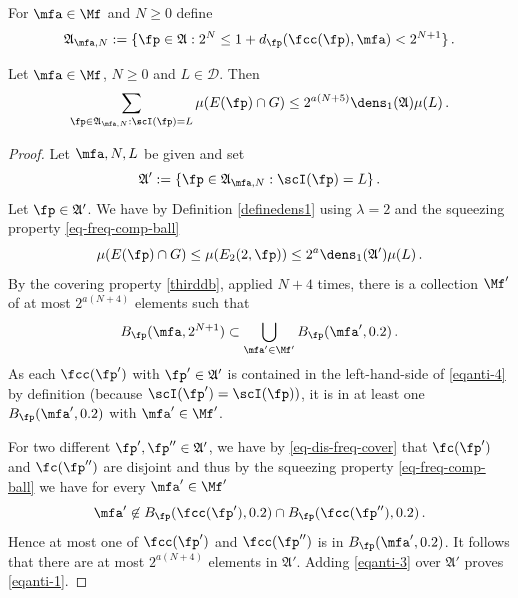 For $\mfa \in \Mf$ and $N\ge 0$ define
\begin{equation}\label{eqantidefap}
    \mathfrak{A}_{\mfa,N}:=\{\fp\in\mathfrak{A}: 2^{N}\le 1+d_{\fp}(\fcc(\fp), \mfa) < 2^{N+1}\} \, .
\end{equation}


\begin{lemma}
\label{stack-density}
\leanok
{}
Let $\mfa \in \Mf$, $N\ge 0$ and
$L\in \mathcal{D}$. Then
\begin{equation}\label{eqanti-1}
    \sum_{\fp\in\mathfrak{A}_{\mfa,N}:\scI(\fp)=L}\mu(E(\fp)\cap G)\le 2^{a(N+5)}\dens_1(\mathfrak{A})\mu(L)\, .
\end{equation}
\end{lemma}
\begin{proof}
\leanok
Let $\mfa,N,L$ be given and set
\begin{equation}
\mathfrak{A}':=\{\fp\in\mathfrak{A}_{\mfa,N}:\scI(\fp)=L\}\, .
\end{equation}
Let
$\fp\in\mathfrak{A}'$.
We have
by Definition \eqref{definedens1}
using $\lambda=2$ and the squeezing property \eqref{eq-freq-comp-ball}
\begin{equation}\label{eqanti-3}
\mu(E(\fp)\cap G)\le \mu(E_2(2, \fp))\le 2^{a}\dens_1(\mathfrak{A}')\mu(L)\, .
\end{equation}
By the covering property \eqref{thirddb}, applied $N+4$ times, there is a collection $\Mf'$ of at most $2^{a(N+4)}$
elements such that
\begin{equation}\label{eqanti-4}
    B_{\fp}(\mfa, 2^{N+1})\subset \bigcup_{\mfa'\in \Mf'}
    B_{\fp}(\mfa', 0.2)\, .
\end{equation}
As each $\fcc(\fp')$ with $\fp'\in \mathfrak{A}'$
is contained in the left-hand-side
of \eqref{eqanti-4}
by definition (because $\scI(\fp') = \scI(\fp))$, it is in at least one $B_{\fp}(\mfa', 0.2)$
with $\mfa'\in \Mf'$.


For two different $\fp',\fp''\in \mathfrak{A}'$, we have by
\eqref{eq-dis-freq-cover} that
$\fc(\fp')$ and $\fc(\fp'')$ are disjoint and thus by the squeezing property \eqref{eq-freq-comp-ball} we have for every $\mfa'\in \Mf'$
\begin{equation}
    \mfa'\not\in B_{\fp}(\fcc(\fp'), 0.2)\cap
B_{\fp}(\fcc(\fp''), 0.2)\, .
\end{equation}
Hence at most one of $\fcc(\fp')$
and $\fcc(\fp'')$ is in
$B_{\fp}(\mfa', 0.2)$.
It follows that there are at most $2^{a(N+4)}$ elements in
$\mathfrak{A}'$. Adding \eqref{eqanti-3} over $\mathfrak{A}'$ proves
\eqref{eqanti-1}.
\end{proof}


